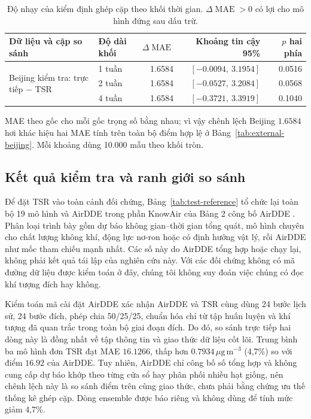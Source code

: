 \documentclass[10pt,a4paper]{article}
\newcommand{\unitpm}{\,\mu\mathrm{g}\,\mathrm{m}^{-3}}
\newcommand{\modelname}{TSR}
\DeclareMathOperator{\MAE}{MAE}
\begin{document}
\begin{table}[H]
  \centering
  \caption{Độ nhạy của kiểm định ghép cặp theo khối thời gian. $\Delta\MAE>0$ có lợi cho mô hình đứng sau dấu trừ.}
  \label{tab:block-bootstrap}
  \begin{threeparttable}
  \begin{tabular}{@{}llrrr@{}}
    \toprule
    Dữ liệu và cặp so sánh & Độ dài khối & $\Delta\MAE$ & Khoảng tin cậy 95\% & $p$ hai phía \\
    \midrule
    \multirow{3}{3.6cm}{Beijing kiểm tra: trực tiếp $-$ \modelname{}} & 1 tuần & 1.6584 & $[-0.0094,\ 3.1954]$ & 0.0516 \\
    & 2 tuần & 1.6584 & $[-0.0527,\ 3.2084]$ & 0.0568 \\
    & 4 tuần & 1.6584 & $[-0.3721,\ 3.3919]$ & 0.1040 \\
    \bottomrule
  \end{tabular}
  \begin{tablenotes}[flushleft]\footnotesize
    \item MAE theo gốc cho mỗi gốc trọng số bằng nhau; vì vậy chênh lệch Beijing $1.6584$ hơi khác hiệu hai MAE tính trên toàn bộ điểm hợp lệ ở Bảng~\ref{tab:external-beijing}. Mỗi khoảng dùng 10.000 mẫu theo khối tròn.
  \end{tablenotes}
  \end{threeparttable}
\end{table}

\subsection{Kết quả kiểm tra và ranh giới so sánh}

Để đặt \modelname{} vào toàn cảnh đối chứng, Bảng~\ref{tab:test-reference} tổ chức lại toàn bộ 19 mô hình và AirDDE trong phần KnowAir của Bảng 2 công bố AirDDE \citep{wu2026airdde}. Phân loại trình bày gồm dự báo không gian--thời gian tổng quát, mô hình chuyên cho chất lượng không khí, động lực nơ-ron hoặc có định hướng vật lý, rồi AirDDE như mốc tham chiếu mạnh nhất. Các số này do AirDDE tổng hợp hoặc chạy lại, không phải kết quả tái lập của nghiên cứu này. Với các đối chứng không có mã đường dữ liệu được kiểm toán ở đây, chúng tôi không suy đoán việc chúng có đọc khí tượng đích hay không.

Kiểm toán mã cài đặt AirDDE xác nhận AirDDE và \modelname{} cùng dùng 24 bước lịch sử, 24 bước đích, phép chia 50/25/25, chuẩn hóa chỉ từ tập huấn luyện và khí tượng đã quan trắc trong toàn bộ giai đoạn đích. Do đó, so sánh trực tiếp hai dòng này là đồng nhất về tập thông tin và giao thức dữ liệu cốt lõi. Trung bình ba mô hình đơn \modelname{} đạt MAE $16.1266$, thấp hơn $0.7934\unitpm$ (4,7\%) so với điểm $16.92$ của AirDDE. Tuy nhiên, AirDDE chỉ công bố số tổng hợp và không cung cấp dự báo khớp theo từng cửa sổ hay phân phối nhiều hạt giống, nên chênh lệch này là so sánh điểm trên cùng giao thức, chưa phải bằng chứng ưu thế thống kê ghép cặp. Dòng ensemble được báo riêng và không dùng để tính mức giảm 4,7\%.
\end{document}
